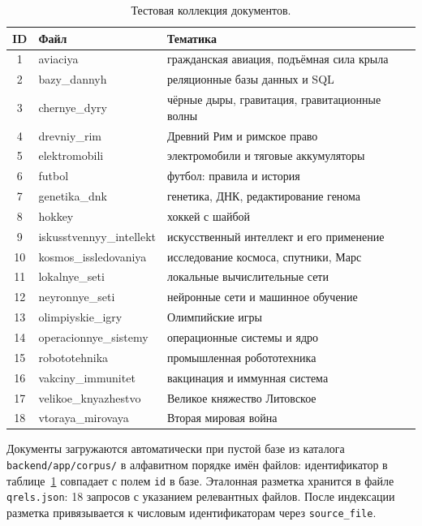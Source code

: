 \begin{table}[H]
	\centering
	\begin{tabular}{|c|p{3.6cm}|p{8.0cm}|}
		\hline
		\textbf{ID} & \textbf{Файл} & \textbf{Тематика} \\
		\hline
		1 & aviaciya & гражданская авиация, подъёмная сила крыла \\
		\hline
		2 & bazy\_dannyh & реляционные базы данных и SQL \\
		\hline
		3 & chernye\_dyry & чёрные дыры, гравитация, гравитационные волны \\
		\hline
		4 & drevniy\_rim & Древний Рим и римское право \\
		\hline
		5 & elektromobili & электромобили и тяговые аккумуляторы \\
		\hline
		6 & futbol & футбол: правила и история \\
		\hline
		7 & genetika\_dnk & генетика, ДНК, редактирование генома \\
		\hline
		8 & hokkey & хоккей с шайбой \\
		\hline
		9 & iskusstvennyy\_intellekt & искусственный интеллект и его применение \\
		\hline
		10 & kosmos\_issledovaniya & исследование космоса, спутники, Марс \\
		\hline
		11 & lokalnye\_seti & локальные вычислительные сети \\
		\hline
		12 & neyronnye\_seti & нейронные сети и машинное обучение \\
		\hline
		13 & olimpiyskie\_igry & Олимпийские игры \\
		\hline
		14 & operacionnye\_sistemy & операционные системы и ядро \\
		\hline
		15 & robototehnika & промышленная робототехника \\
		\hline
		16 & vakciny\_immunitet & вакцинация и иммунная система \\
		\hline
		17 & velikoe\_knyazhestvo & Великое княжество Литовское \\
		\hline
		18 & vtoraya\_mirovaya & Вторая мировая война \\
		\hline
	\end{tabular}
	\caption{Тестовая коллекция документов.}
	\label{tab:collection}
\end{table}

Документы загружаются автоматически при пустой базе из каталога \texttt{backend/app/corpus/} в алфавитном порядке имён файлов: идентификатор в таблице~\ref{tab:collection} совпадает с полем \texttt{id} в базе. Эталонная разметка хранится в файле \texttt{qrels.json}: 18 запросов с указанием релевантных файлов. После индексации разметка привязывается к числовым идентификаторам через \texttt{source\_file}.

